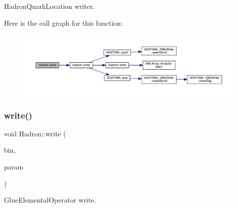 Hadron\+Quark\+Location writer. 

Here is the call graph for this function\+:
\nopagebreak
\begin{figure}[H]
\begin{center}
\leavevmode
\includegraphics[width=350pt]{d1/daf/namespaceHadron_a8953a24e53ffe4d60e9c0ba26a48a9e3_cgraph}
\end{center}
\end{figure}
\mbox{\label{namespaceHadron_aee7b5924c79af024abb8c3d99f7e8b34}} 
\subsubsection{\texorpdfstring{write()}{write()}\hspace{0.1cm}{\footnotesize\ttfamily [65/95]}}
{\footnotesize\ttfamily void Hadron\+::write (\begin{DoxyParamCaption}\item[{\mbox{\hyperlink{classADATIO_1_1BinaryWriter}{Binary\+Writer}} \&}]{bin,  }\item[{const \mbox{\hyperlink{structHadron_1_1ValGlueElementalOperator__t}{Val\+Glue\+Elemental\+Operator\+\_\+t}} \&}]{param }\end{DoxyParamCaption})}



Glue\+Elemental\+Operator write. 

